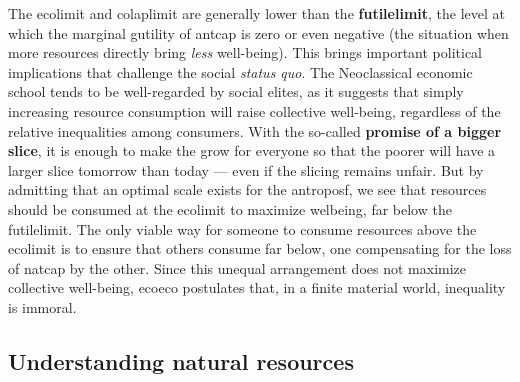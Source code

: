 \documentclass[./main_en.tex]{subfiles}
\begin{document}
\par The \gls{ecolimit} and \gls{colaplimit} are generally lower than the \textbf{\gls{futilelimit}}, the level at which the marginal \gls{gutility} of \gls{antcap} is zero or even negative (the situation when more resources directly bring \textit{less} well-being). This brings important political implications that challenge the social \textit{status quo}. The Neoclassical economic school tends to be well-regarded by social elites, as it suggests that simply increasing resource consumption will raise collective well-being, regardless of the relative inequalities among consumers. With the so-called \textbf{promise of a bigger slice}, it is enough to make the  grow for everyone so that the poorer will have a larger slice tomorrow than today — even if the slicing remains unfair. But by admitting that an optimal scale exists for the \gls{antroposf}, we see that resources should be consumed at the \gls{ecolimit} to maximize \gls{welbeing}, far below the \gls{futilelimit}. The only viable way for someone to consume resources above the \gls{ecolimit} is to ensure that others consume far below, one compensating for the loss of \gls{natcap} by the other. Since this unequal arrangement does not maximize collective well-being, \gls{ecoeco} postulates that, in a finite material world, inequality is immoral.

\subsection{Understanding natural resources} \label{subsec:natrec}
\end{document}
